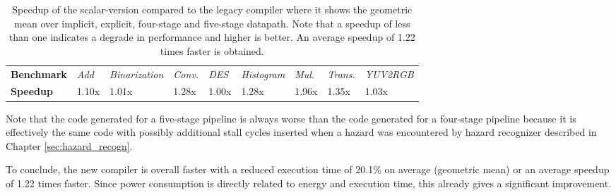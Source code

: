 \begin{table}[t!]
\caption{Speedup of the scalar-version compared to the legacy compiler where it shows the geometric mean over implicit, explicit, four-stage and five-stage datapath. Note that a speedup of less than one indicates a degrade in performance and higher is better. An average speedup of 1.22 times faster is obtained.}
\begin{center}
\begin{tabular}{@{}l | l l l l l l l l @{}}
\toprule
\textbf{Benchmark} 	& \emph{Add} & \emph{Binarization} & \emph{Conv.} & \emph{DES} & \emph{Histogram} & \emph{Mul.} & \emph{Trans.} & \emph{YUV2RGB}\\
\textbf{Speedup} 	& 1.10x & 1.01x & 1.28x & 1.00x & 1.28x & 1.96x & 1.35x & 1.03x\\
\bottomrule
\end{tabular}
\end{center}
\label{table:scalar_speedup}
\end{table}%



Note that the code generated for a five-stage pipeline is always worse than the code generated for a four-stage pipeline because it is effectively the same code with possibly additional stall cycles inserted when a hazard was encountered by hazard recognizer described in Chapter \ref{sec:hazard_recogn}.

To conclude, the new compiler is overall faster with a reduced execution time of 20.1\% on average (geometric mean) or an average speedup of 1.22 times faster. Since power consumption is directly related to energy and execution time, this already gives a significant improvement. \\

